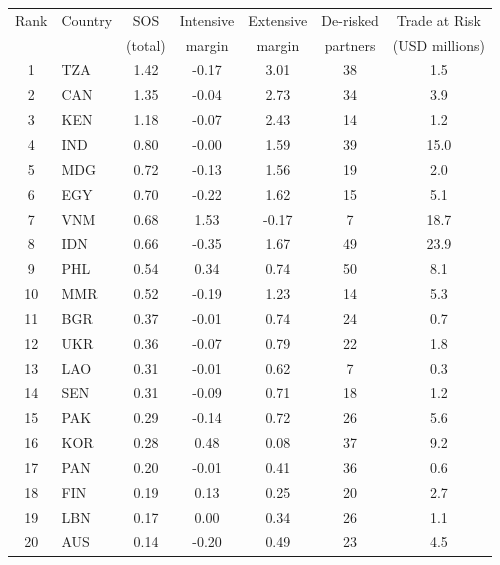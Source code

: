 \begin{tabular}{clccccc}
\toprule
Rank & Country & SOS & Intensive & Extensive & De-risked & Trade at Risk \\
 & & (total) & margin & margin & partners & (USD millions) \\
\midrule
1 & TZA & 1.42 & -0.17 & 3.01 & 38 & 1.5 \\
2 & CAN & 1.35 & -0.04 & 2.73 & 34 & 3.9 \\
3 & KEN & 1.18 & -0.07 & 2.43 & 14 & 1.2 \\
4 & IND & 0.80 & -0.00 & 1.59 & 39 & 15.0 \\
5 & MDG & 0.72 & -0.13 & 1.56 & 19 & 2.0 \\
6 & EGY & 0.70 & -0.22 & 1.62 & 15 & 5.1 \\
7 & VNM & 0.68 & 1.53 & -0.17 & 7 & 18.7 \\
8 & IDN & 0.66 & -0.35 & 1.67 & 49 & 23.9 \\
9 & PHL & 0.54 & 0.34 & 0.74 & 50 & 8.1 \\
10 & MMR & 0.52 & -0.19 & 1.23 & 14 & 5.3 \\
11 & BGR & 0.37 & -0.01 & 0.74 & 24 & 0.7 \\
12 & UKR & 0.36 & -0.07 & 0.79 & 22 & 1.8 \\
13 & LAO & 0.31 & -0.01 & 0.62 & 7 & 0.3 \\
14 & SEN & 0.31 & -0.09 & 0.71 & 18 & 1.2 \\
15 & PAK & 0.29 & -0.14 & 0.72 & 26 & 5.6 \\
16 & KOR & 0.28 & 0.48 & 0.08 & 37 & 9.2 \\
17 & PAN & 0.20 & -0.01 & 0.41 & 36 & 0.6 \\
18 & FIN & 0.19 & 0.13 & 0.25 & 20 & 2.7 \\
19 & LBN & 0.17 & 0.00 & 0.34 & 26 & 1.1 \\
20 & AUS & 0.14 & -0.20 & 0.49 & 23 & 4.5 \\
\bottomrule
\end{tabular}